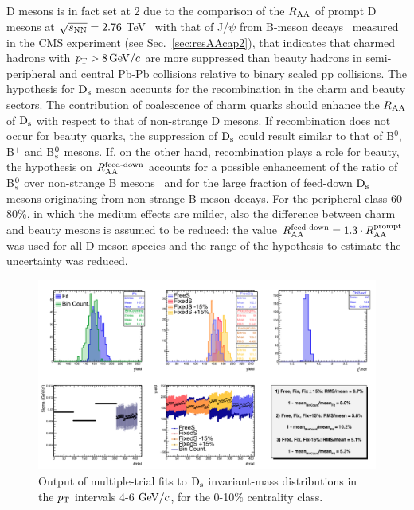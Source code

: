 D mesons is in fact set at 2  due to the comparison of the $R_{\rm AA}$ of prompt D mesons at 
$\sqrt{s_{\rm NN}} = 2.76$ TeV~\cite{Adam:2015nna} with that of J/$\psi$ from B-meson decays~\cite{Khachatryan:2016ypw} 
measured in the CMS experiment (see Sec.~\ref{sec:resAAcap2}), that indicates that charmed hadrons 
with $p_{\rm T} > 8 \, \mathrm{GeV}/c$ are more suppressed than beauty hadrons in semi-peripheral and central
Pb-Pb collisions relative to binary scaled pp collisions. The hypothesis for ${\rm D_s}$ meson
accounts for the recombination in the charm and beauty sectors.
The contribution of coalescence of charm quarks should enhance the $R_{\rm AA}$ of
${\rm D_s}$ with respect to that of non-strange D mesons. If recombination does not occur
for beauty quarks, the suppression of ${\rm D_s}$ could result similar to that of  B$^0$, B$^+$ and B$^0_{\rm s}$
mesons. If, on the other hand, recombination plays a role for beauty,
the hypothesis on $R_{\rm AA}^{\textnormal{feed-down}}$ accounts for a possible enhancement 
of the ratio of B$^0_{\rm s}$ over non-strange B mesons~\cite{TAMULHC}
and for the large fraction of feed-down ${\rm D_s}$ mesons originating from non-strange B-meson decays.
For the peripheral class 60--80\%, in which the medium effects are milder, 
also the difference between charm and beauty mesons is assumed to be 
reduced: the value $R_{\rm AA}^{\textnormal{feed-down}}=1.3\cdot R_{\rm AA}^{\rm prompt}$ 
was used for all D-meson species and the range of the hypothesis to estimate the
uncertainty was reduced. 

\begin{figure}[!htb]
 \begin{center}
\includegraphics[width=15.cm]{./FigCap5/MT_Pt46_010.png}
\end{center}
 \caption{Output of multiple-trial fits to ${\rm D_s}$ invariant-mass distributions in the $p_{\rm T}$ intervals 4-6 $\mathrm{GeV}/c$, for the 0-10$\%$ centrality class.}
 \label{fig:multitrial_Ds_010}
\end{figure}


